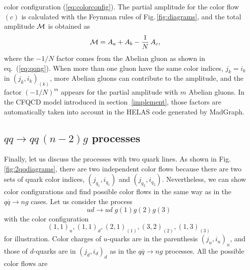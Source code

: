 color configuration (\ref{eq:colorconfig}). The partial amplitude for the color flow $(c)$ is calculated with the Feynman rules of
Fig.\,\ref{fig:diagrams}, and the total amplitude ${\cal M}$ is obtained as
\begin{align}
  {\cal M} &= A_a + A_b -\frac{1}{N}\,A_c,
\end{align}
where the $-1/N$ factor comes from the Abelian gluon as shown in eq.~(\ref{eq:qqng}). When more than one gluon have the same color indices, $j_k=i_k$ in
$(j_k,i_k)_{(k)}$, more Abelian gluons can contribute to the amplitude,
and the factor $\left(-1/N\right)^m$ appears for the partial amplitude with $m$ Abelian gluons. In the CFQCD model introduced in section~\ref{implement}, those factors are automatically taken into account in the HELAS code generated by MadGraph.
\subsection{$qq\rightarrow qq\,(n-2)g$ processes}
\label{qq}
Finally, let us discuss the processes with two quark lines. As shown in
Fig.\,\ref{fig:2qqdiagrams}, there are two independent color flows because there are two sets of quark color
indices, $(j_{q_1}, i_{q_1})$ and $(j_{q_2}, i_{q_2})$. Nevertheless, we
can show color configurations and find possible color flows in the same
way as in the $q\overline{q}\rightarrow ng$ cases. Let us consider the process
\begin{equation}
 u d\rightarrow u d \;g(1) g(2) g(3)
\end{equation}
with the color configuration
\begin{equation}
  (1,1)_u,(1,1)_d,(2,1)_{(1)},(3,2)_{(2)},(1,3)_{(3)}
\end{equation}
for illustration. Color charges of $u$-quarks are in the parenthesis
$(j_u,i_u)_u$, and those of $d$-quarks are in $(j_d,i_d)_d$ as in
the $q\overline{q}\rightarrow ng$ processes. All the possible color
flows are
